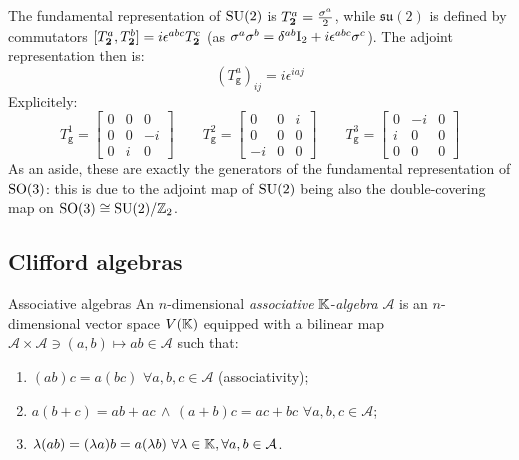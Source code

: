 The fundamental representation of $ \mathrm{SU}(2) $ is $ T^a_{\mathbf{2}} = \frac{\sigma^a}{2} $, while $ \mathfrak{su}(2) $ is defined by commutators $ [T^a_{\mathbf{2}},T^b_{\mathbf{2}}] = i \epsilon^{abc} T^c_{\mathbf{2}} $ (as $ \sigma^a \sigma^b = \delta^{ab} \mathrm{I}_2 + i \epsilon^{abc} \sigma^c $). The adjoint representation then is:
\begin{equation}
  (T^a_\mathtt{g})_{ij} = i \epsilon^{iaj}
\end{equation}
Explicitely:
\begin{equation*}
  T^1_\mathtt{g} =
  \begin{bmatrix}
    0 & 0 & 0 \\
    0 & 0 & -i \\
    0 & i & 0
  \end{bmatrix}
  \qquad
  T^2_\mathtt{g} =
  \begin{bmatrix}
    0 & 0 & i \\
    0 & 0 & 0 \\
    -i & 0 & 0
  \end{bmatrix}
  \qquad
  T^3_\mathtt{g} =
  \begin{bmatrix}
    0 & -i & 0 \\
    i & 0 & 0 \\
    0 & 0 & 0
  \end{bmatrix}
\end{equation*}
As an aside, these are exactly the generators of the fundamental representation of $ \mathrm{SO}(3) $: this is due to the adjoint map of $ \mathrm{SU}(2) $ being also the double-covering map on $ \mathrm{SO}(3) \cong \mathrm{SU}(2) / \mathbb{Z}_2 $.

\subsection{Clifford algebras}

\begin{definition}{Associative algebras}{}
  An $ n $-dimensional \textit{associative} $ \mathbb{K} $-\textit{algebra} $ \mathcal{A} $ is an $ n $-dimensional vector space $ V(\mathbb{K}) $ equipped with a bilinear map $ \mathcal{A} \times \mathcal{A} \ni (a,b) \mapsto ab \in \mathcal{A} $ such that:
  \begin{enumerate}
    \item $ (ab)c = a(bc) \,\,\forall a,b,c \in \mathcal{A} $ (associativity);
    \item $ a(b + c) = ab + ac \,\land\, (a + b)c = ac + bc \,\,\forall a,b,c \in \mathcal{A} $;
    \item $ \lambda (ab) = (\lambda a)b = a(\lambda b) \,\,\forall \lambda \in \mathbb{K}, \forall a,b \in \mathcal{A} $.
  \end{enumerate}
\end{definition}

